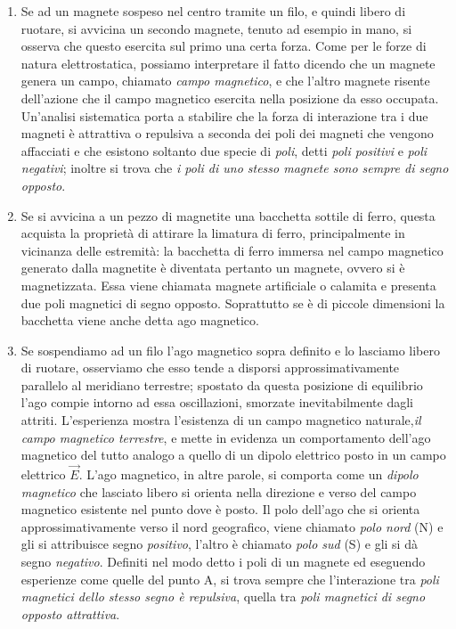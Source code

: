\documentclass[class=book, crop=false, oneside, 12pt]{standalone}
\begin{document}
\begin{enumerate}
    \item Se ad un magnete sospeso nel centro tramite un filo, e quindi libero di ruotare, si avvicina un secondo magnete, tenuto ad esempio in mano, si osserva che questo esercita sul primo una certa forza. 
    Come per le forze di natura elettrostatica, possiamo interpretare il fatto dicendo che un magnete genera un campo, chiamato \emph{campo magnetico}, e che l'altro magnete risente dell'azione che il campo magnetico esercita nella posizione da esso occupata. 
    Un'analisi sistematica porta a stabilire che la forza di interazione tra i due magneti è attrattiva o repulsiva a seconda dei poli dei magneti che vengono affacciati e che esistono soltanto due specie di \emph{poli}, detti \emph{poli positivi} e \emph{poli negativi}; inoltre si trova che \emph{i poli di uno stesso magnete sono sempre di segno opposto}. 
    \item Se si avvicina a un pezzo di magnetite una bacchetta sottile di ferro, questa acquista la proprietà di attirare la limatura di ferro, principalmente in vicinanza delle estremità: la bacchetta di ferro immersa nel campo magnetico generato dalla magnetite è diventata pertanto un magnete, ovvero si è magnetizzata. 
    Essa viene chiamata magnete artificiale o calamita e presenta due poli magnetici di segno opposto. 
    Soprattutto se è di piccole dimensioni la bacchetta viene anche detta ago magnetico. 
    \item Se sospendiamo ad un filo l'ago magnetico sopra definito e lo lasciamo libero di ruotare, osserviamo che esso tende a disporsi approssimativamente parallelo al meridiano terrestre; spostato da questa posizione di equilibrio l'ago compie intorno ad essa oscillazioni, smorzate inevitabilmente dagli attriti. 
    L'esperienza mostra l'esistenza di un campo magnetico naturale,\emph{il campo magnetico terrestre}, e mette in evidenza un comportamento dell'ago magnetico del tutto analogo a quello di un dipolo elettrico posto in un campo elettrico \(\overrightarrow{E}\). 
    L'ago magnetico, in altre parole, si comporta come un \emph{dipolo magnetico} che lasciato libero si orienta nella direzione e verso del campo magnetico esistente nel punto dove è posto. 
    Il polo dell'ago che si orienta approssimativamente verso il nord geografico, viene chiamato \emph{polo nord} (N) e  gli si attribuisce segno \emph{positivo}, l'altro è chiamato \emph{polo sud} (S) e  gli si dà segno \emph{negativo}. 
    Definiti nel modo detto i poli di un magnete ed eseguendo esperienze come quelle del punto A, si trova sempre che l'interazione tra \emph{poli magnetici dello stesso segno è repulsiva}, quella tra \emph{poli magnetici di segno opposto attrattiva}.

\end{enumerate}
\end{document}
